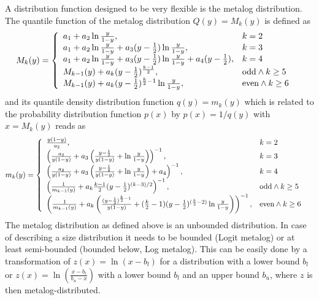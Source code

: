 A distribution function designed to be very flexible is the metalog distribution.
The quantile function of the metalog distribution $Q(y)=M_{k}(y)$ is defined as \cite{Keelin2011,Keelin2016,Keelin2019}
\begin{align}
 M_{k}(y) &=
 \left\{{\begin{array}{ll}
    a_{1}+a_{2}\ln {y \over {1-y}},&  k=2\\
    a_{1}+a_{2}\ln {y \over {1-y}} +a_{3}(y-\frac12)\ln {y \over {1-y}},& k=3 \\
    a_{1}+a_{2}\ln {y \over {1-y}} +a_{3}(y-\frac12)\ln {y \over {1-y}}+a_{4}(y-\frac12),& k=4 \\
    M_{k-1}(y)+a_{k}(y-\frac12)^{k-1 \over 2},&{\mbox{odd}}\wedge k\geq 5 \\
    M_{k-1}(y)+a_{k}(y-\frac12)^{{k \over 2}-1}\ln {y \over {1-y}}, &{\mbox{even}}\wedge k\geq 6 \\
 \end{array}}\right. \label{eq:Mk}
\end{align}
and its quantile density distribution function $q(y)=m_k(y)$ which is related to the probability distribution function $p(x)$ by $p(x)=1/q(y)$ with $x=M_{k}(y)$ reads as
\begin{align}
\label{eq:mk}
 m_{k}(y) &=
\left\{
  \begin{array}{ll}
    {y(1-y) \over {a_{2}}}, & k=2 \\
    \left({a_{2} \over {y(1-y)}}+a_{3}\left({y-\frac12 \over {y(1-y)}}+\ln {y \over {1-y}}\right)\right)^{-1}, & k=3\\
    \left({a_{2} \over {y(1-y)}}+a_{3}\left({y-\frac12 \over {y(1-y)}}+\ln {y \over {1-y}}\right)+a_{4}\right)^{-1}, &k=4\\
    \left({1 \over {m_{k-1}(y)}}+a_{k}{\frac{k-1}{2}}(y-\frac12)^{(k-3)/2}\right)^{-1}, & \mbox{odd} \wedge  k\geq 5\\
    \left({1 \over {m_{k-1}(y)}}+a_{k}\left({(y-\frac12)^{\frac{k}{2}-1} \over {y(1-y)}}+({k \over 2}-1)(y-\frac12)^{(\frac{k}{2}-2)}\ln {y \over {1-y}}\right)\right)^{-1}, &\mbox{even} \wedge  k\geq 6\\
 \end{array}
\right.
\end{align}
The metalog distribution as defined above is an unbounded distribution. In case of describing a size distribution it needs to be bounded (Logit metalog) or at least semi-bounded (bounded below, Log metalog). This can be easily done by a transformation of $z(x) = \ln \left(x-b_l\right)$ for a distribution with a lower bound $b_l$ or $z(x)=\ln\left(\frac{x-b_l}{b_u-x}\right)$ with a lower bound $b_l$ and an upper bound $b_u$, where $z$ is then metalog-distributed.
